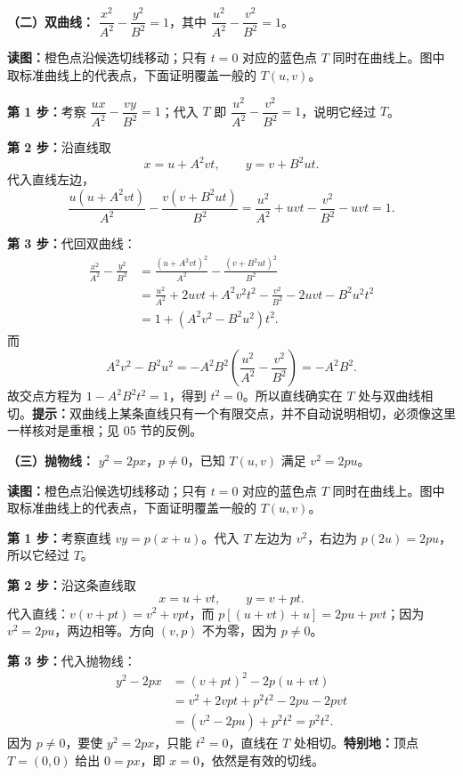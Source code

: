 \begin{proofbox}
\begin{samepage}
\textbf{（二）双曲线：}\; $\dfrac{x^2}{A^2}-\dfrac{y^2}{B^2}=1$，其中 $\dfrac{u^2}{A^2}-\dfrac{v^2}{B^2}=1$。
\begin{center}\end{center}
\noindent\textbf{读图：}橙色点沿候选切线移动；只有 $t=0$ 对应的蓝色点 $T$ 同时在曲线上。图中取标准曲线上的代表点，下面证明覆盖一般的 $T(u,v)$。
\end{samepage}

\textbf{第 1 步：}考察 $\dfrac{ux}{A^2}-\dfrac{vy}{B^2}=1$；代入 $T$ 即 $\dfrac{u^2}{A^2}-\dfrac{v^2}{B^2}=1$，说明它经过 $T$。

\textbf{第 2 步：}沿直线取
\[
x=u+A^2vt,\qquad y=v+B^2ut.
\]
代入直线左边，
\[
\frac{u(u+A^2vt)}{A^2}-\frac{v(v+B^2ut)}{B^2}
=\frac{u^2}{A^2}+uvt-\frac{v^2}{B^2}-uvt=1.
\]

\textbf{第 3 步：}代回双曲线：
\[
\begin{aligned}
\frac{x^2}{A^2}-\frac{y^2}{B^2}
&=\frac{(u+A^2vt)^2}{A^2}-\frac{(v+B^2ut)^2}{B^2}\\
&=\frac{u^2}{A^2}+2uvt+A^2v^2t^2-\frac{v^2}{B^2}-2uvt-B^2u^2t^2\\
&=1+(A^2v^2-B^2u^2)t^2.
\end{aligned}
\]
而
\[
A^2v^2-B^2u^2=-A^2B^2\left(\frac{u^2}{A^2}-\frac{v^2}{B^2}\right)=-A^2B^2.
\]
故交点方程为 $1-A^2B^2t^2=1$，得到 $t^2=0$。所以直线确实在 $T$ 处与双曲线相切。\textbf{提示：}双曲线上某条直线只有一个有限交点，并不自动说明相切，必须像这里一样核对是重根；见 05 节的反例。

\begin{samepage}
\textbf{（三）抛物线：}\; $y^2=2px$，$p\ne0$，已知 $T(u,v)$ 满足 $v^2=2pu$。
\begin{center}\end{center}
\noindent\textbf{读图：}橙色点沿候选切线移动；只有 $t=0$ 对应的蓝色点 $T$ 同时在曲线上。图中取标准曲线上的代表点，下面证明覆盖一般的 $T(u,v)$。
\end{samepage}

\textbf{第 1 步：}考察直线 $vy=p(x+u)$。代入 $T$ 左边为 $v^2$，右边为 $p(2u)=2pu$，所以它经过 $T$。

\textbf{第 2 步：}沿这条直线取
\[
x=u+vt,\qquad y=v+pt.
\]
代入直线：$v(v+pt)=v^2+vpt$，而 $p[(u+vt)+u]=2pu+pvt$；因为 $v^2=2pu$，两边相等。方向 $(v,p)$ 不为零，因为 $p\ne0$。

\textbf{第 3 步：}代入抛物线：
\[
\begin{aligned}
y^2-2px
&=(v+pt)^2-2p(u+vt)\\
&=v^2+2vpt+p^2t^2-2pu-2pvt\\
&=(v^2-2pu)+p^2t^2=p^2t^2.
\end{aligned}
\]
因为 $p\ne0$，要使 $y^2=2px$，只能 $t^2=0$，直线在 $T$ 处相切。\textbf{特别地：}顶点 $T=(0,0)$ 给出 $0=p x$，即 $x=0$，依然是有效的切线。


\end{proofbox}
